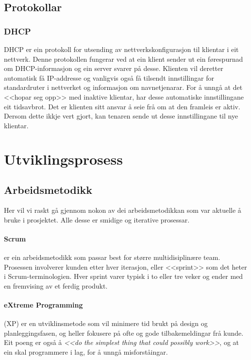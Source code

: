 \documentclass[nynorsk,12pt,a4paper,oneside]{book}
\begin{document}
\subsection{Protokollar}
\subsubsection{DHCP}
DHCP er ein protokoll for utsending av nettverkskonfigurasjon til klientar i eit nettverk. Denne protokollen fungerar ved at ein klient sender ut ein førespurnad om DHCP-informasjon og ein server svarer på desse. Klienten vil deretter automatisk få IP-addresse og vanligvis også få tilsendt innstillingar for standardruter i nettverket og informasjon om navnetjenarar.  \cite{datakom} 
For å unngå at det <<hopar seg opp>> med inaktive klientar, har desse automatiske innstillingane eit tidsavbrot. Det er klienten sitt ansvar å seie frå om at den framleis er aktiv. Dersom dette ikkje vert gjort, kan tenaren sende ut desse innstillingane til nye klientar. \cite{rfc2131}

\section{Utviklingsprosess}
\subsection{Arbeidsmetodikk}
Her vil vi raskt gå gjennom nokon av dei arbeidsmetodikkan som var aktuelle å bruke i prosjektet. Alle desse er smidige og iterative prosessar. 

\paragraph{Scrum} er ein arbeidsmetodikk som passar best for større multidisiplinære team. Prosessen involverer kunden etter hver iterasjon, eller <<sprint>> som det heter i Scrum-terminologien. Hver sprint varer typisk i to eller tre veker og ender med en fremvising av et ferdig produkt. \cite{scrumprimer}

\paragraph{eXtreme Programming} (XP) er en utviklinsmetode som vil minimere tid brukt på design og planleggingsfasen, og heller fokusere på ofte og gode tilbakemeldingar frå kunde. Eit poeng er også å \emph{<<do the simplest thing that could possibly work>>}, \cite{xpbook}  og at ein skal programmere i lag, for å unngå misforståingar. 
\end{document}

